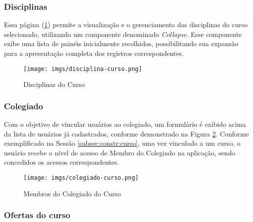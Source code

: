 \subsubsection{Disciplinas}

Essa página (\ref{fig:disciplina:curso}) permite a visualização e o gerenciamento das disciplinas do curso selecionado, utilizando um componente denominado \textit{Collapse}. Esse componente exibe uma lista de painéis inicialmente recolhidos, possibilitando sua expansão para a apresentação completa dos registros correspondentes.


\begin{figure}[h]
    \centering
    \texttt{[image: imgs/disciplina-curso.png]}
    \caption{Disciplinas do Curso}
    \label{fig:disciplina:curso}
\end{figure}

\subsubsection{Colegiado}

Com o objetivo de vincular usuários ao colegiado, um formulário é exibido acima da lista de usuários já cadastrados, conforme demonstrado na Figura \ref{fig:colegiado:curso}. Conforme exemplificado na Sessão \ref{subsec:constr:curso}, uma vez vinculado a um curso, o usuário recebe o nível de acesso de Membro do Colegiado na aplicação, sendo concedidos os acessos correspondentes.


\begin{figure}[h]
    \centering
    \texttt{[image: imgs/colegiado-curso.png]}
    \caption{Membros do Colegiado do Curso}
    \label{fig:colegiado:curso}
\end{figure}



\subsubsection{Ofertas do curso} \label{subsec:oferta:curso}

